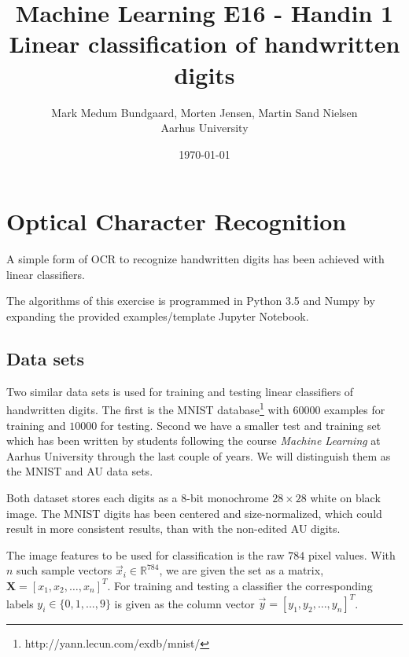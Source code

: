 \documentclass[a4paper,10pt,article,oneside,english]{memoir}
\begin{document}
	\title{Machine Learning E16 - Handin 1\\Linear classification of handwritten digits}
	\author{Mark Medum Bundgaard, Morten Jensen, Martin Sand Nielsen\\ Aarhus University}
	\date{\today}
	
	\mainmatter
	\maketitle



\chapter{Optical Character Recognition}
A simple form of OCR to recognize handwritten digits has been achieved with linear classifiers. 

The algorithms of this exercise is programmed in Python 3.5 and Numpy by expanding the provided examples/template Jupyter Notebook.

\section{Data sets}
Two similar data sets is used for training and testing linear classifiers of handwritten digits. The first is the MNIST database\footnote{http://yann.lecun.com/exdb/mnist/} with $60000$ examples for training and $10000$ for testing. Second we have a smaller test and training set which has been written by students following the course \emph{Machine Learning} at Aarhus University through the last couple of years. We will distinguish them as the MNIST and AU data sets.


Both dataset stores each digits as a 8-bit monochrome $28\times28$ white on black image. The MNIST digits has been centered and size-normalized, which could result in more consistent results, than with the non-edited AU digits. 

The image features to be used for classification is the raw $784$ pixel values. With $n$ such sample vectors $\vec{x}_i\in \mathbb{R}^{784}$, we are given the set as a matrix, $\mathbf{X} = [x_1, x_2, \dots, x_n]^T$. For training and testing a classifier the corresponding labels $y_i \in \{0,1,\dots,9\}$ is given as the column vector $\vec{y} = [y_1, y_2, \dots, y_n]^T$. 
\end{document}
